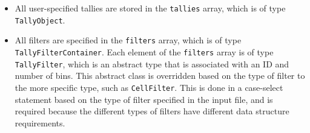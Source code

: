 \documentclass[10pt]{article}
\numberwithin{equation}{section} %
\begin{document}
\begin{itemize}
\item All user-specified tallies are stored in the {\tt tallies} array, which is of type {\tt TallyObject}.
\item All filters are specified in the {\tt filters} array, which is of type {\tt TallyFilterContainer}. Each element of the {\tt filters} array is of type {\tt TallyFilter}, which is an abstract type that is associated with an ID and number of bins. This abstract class is overridden based on the type of filter to the more specific type, such as {\tt CellFilter}. This is done in a case-select statement based on the type of filter specified in the input file, and is required because the different types of filters have different data structure requirements.
\end{itemize}
\end{document}
